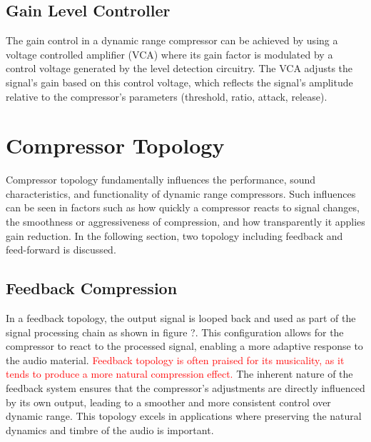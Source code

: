 \documentclass[10pt]{article}
\begin{document}
\begin{multicols*}{2}
            \subsection{Gain Level Controller}
                The gain control in a dynamic range compressor can be achieved by using a voltage controlled amplifier (VCA) where its gain factor is modulated by a control voltage generated by the level detection circuitry. The VCA adjusts the signal's gain based on this control voltage, which reflects the signal's amplitude relative to the compressor's parameters (threshold, ratio, attack, release).
            
        \section{Compressor Topology}
            Compressor topology fundamentally influences the performance, sound characteristics, and functionality of dynamic range compressors. Such influences can be seen in factors such as how quickly a compressor reacts to signal changes, the smoothness or aggressiveness of compression, and how transparently it applies gain reduction. In the following section, two topology including feedback and feed-forward is discussed.

            \subsection{Feedback Compression}  
                In a feedback topology, the output signal is looped back and used as part of the signal processing chain as shown in figure ?. This configuration allows for the compressor to react to the processed signal, enabling a more adaptive response to the audio material. \textcolor{red}{Feedback topology is often praised for its musicality, as it tends to produce a more natural compression effect.} The inherent nature of the feedback system ensures that the compressor's adjustments are directly influenced by its own output, leading to a smoother and more consistent control over dynamic range. This topology excels in applications where preserving the natural dynamics and timbre of the audio is important.
                
                \noindent
                \begin{minipage}{\linewidth}

                    \centering

                    \begin{tikzpicture}


\end{tikzpicture}
\end{minipage}
\end{multicols*}
\end{document}
